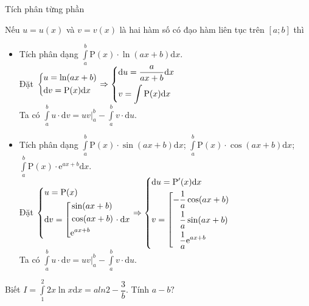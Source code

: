 	\begin{dang}{Tích phân từng phần }

	Nếu $ u = u(x) $ và $ v = v(x) $ là hai hàm số có đạo hàm liên tục trên $ [a;b] $ thì 
	\begin{center}
	\end{center}
	\begin{itemize}
		\item Tích phân dạng $ \displaystyle \int \limits_a^b \mathrm{P} (x) \cdot \ln (ax+b) \mathrm{d} x$.\\
			Đặt $ \left\{\begin{aligned}&u = \ln(ax+b) \\&\mathrm{d}v = \mathrm{P}(x) \mathrm{d}x\end{aligned}\right. \Rightarrow \left\{\begin{aligned}&\mathrm{d}u = \dfrac{a}{ax+b} \mathrm{d}x \\&v = \int \mathrm{P}(x) \mathrm{d}x\end{aligned}\right. $\\
		Ta có $ \displaystyle \int \limits_a^b u \cdot \mathrm{d}v = uv \bigr|_a^b - \displaystyle \int \limits_a^b v \cdot \mathrm{d}u$.
		\item 	Tích phân dạng $ \displaystyle \int \limits_a^b \mathrm{P}(x) \cdot \sin (ax+b) \mathrm{d}x$; $ \displaystyle \int \limits_a^b \mathrm{P}(x) \cdot \cos (ax+b) \mathrm{d}x$; $ \displaystyle \int \limits_a^b \mathrm{P}(x) \cdot \mathrm{e}^{ax+b} \mathrm{d}x$.\\ 
		Đặt $ \left\{\begin{aligned}&u = \mathrm{P} (x)\\&\mathrm{d}v = \left[\begin{aligned}&\sin (ax+b)\\ &\cos (ax+b)\\ &\mathrm{e}^{ax+b}\end{aligned}\right. \cdot \mathrm{d}x\end{aligned}\right. \Rightarrow \left\{\begin{aligned}&\mathrm{d}u = \mathrm{P}'(x)  \mathrm{d}x \\&v = \left[\begin{aligned}-&\dfrac{1}{a}\cos (ax+b)\\&\dfrac{1}{a} \sin (ax+b)\\&\dfrac{1}{a} \mathrm{e}^{ax+b}\end{aligned}\right.\end{aligned}\right. $\\
			Ta có $ \displaystyle \int \limits_a^b u \cdot \mathrm{d}v = uv \bigr|_a^b - \displaystyle \int \limits_a^b v \cdot \mathrm{d}u$.
	
	\end{itemize}

	
	\end{dang}
\setcounter{vd}{0}
	\begin{vd}%
		Biết $ I = \displaystyle \int \limits_1^2 2x \ln x \mathrm{d} x = aln2 -\dfrac{3}{b}$. Tính $ a - b? $ 
	\end{vd}
